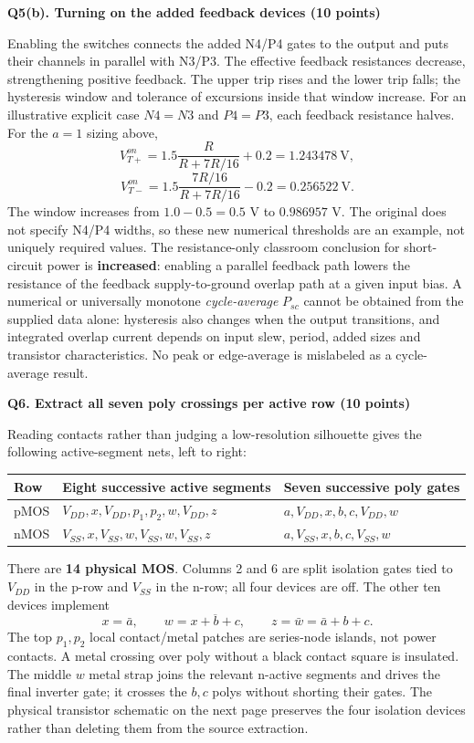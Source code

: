 \documentclass[10pt]{article}
\newcommand{\qheading}[1]{\par\medskip\textbf{#1}\par}
\begin{document}
\newpage
\qheading{Q5(b). Turning on the added feedback devices (10 points)}
Enabling the switches connects the added N4/P4 gates to the output and puts their channels in parallel with N3/P3. The effective feedback resistances decrease, strengthening positive feedback. The upper trip rises and the lower trip falls; the hysteresis window and tolerance of excursions inside that window increase.
For an illustrative explicit case $N4=N3$ and $P4=P3$, each feedback resistance halves. For the $a=1$ sizing above,
\[
V_{T+}^{on}=1.5\frac{R}{R+7R/16}+0.2=1.243478\ \mathrm V,
\]
\[
V_{T-}^{on}=1.5\frac{7R/16}{R+7R/16}-0.2=0.256522\ \mathrm V.
\]
The window increases from $1.0-0.5=0.5$ V to $0.986957$ V. The original does not specify N4/P4 widths, so these new numerical thresholds are an example, not uniquely required values.
The resistance-only classroom conclusion for short-circuit power is \textbf{increased}: enabling a parallel feedback path lowers the resistance of the feedback supply-to-ground overlap path at a given input bias. A numerical or universally monotone \emph{cycle-average} $P_{sc}$ cannot be obtained from the supplied data alone: hysteresis also changes when the output transitions, and integrated overlap current depends on input slew, period, added sizes and transistor characteristics. No peak or edge-average is mislabeled as a cycle-average result.
\qheading{Q6. Extract all seven poly crossings per active row (10 points)}
Reading contacts rather than judging a low-resolution silhouette gives the following active-segment nets, left to right:
\begin{center}\begin{tabular}{lll}\toprule
Row&Eight successive active segments&Seven successive poly gates\\\midrule
pMOS&$V_{DD},x,V_{DD},p_1,p_2,w,V_{DD},z$&$a,V_{DD},x,b,c,V_{DD},w$\\
nMOS&$V_{SS},x,V_{SS},w,V_{SS},w,V_{SS},z$&$a,V_{SS},x,b,c,V_{SS},w$\\\bottomrule
\end{tabular}\end{center}
There are \textbf{14 physical MOS}. Columns 2 and 6 are split isolation gates tied to $V_{DD}$ in the p-row and $V_{SS}$ in the n-row; all four devices are off. The other ten devices implement
\[
x=\bar a,\qquad w=\overline{x+b+c},\qquad z=\bar w=\bar a+b+c.
\]
The top $p_1,p_2$ local contact/metal patches are series-node islands, not power contacts. A metal crossing over poly without a black contact square is insulated. The middle $w$ metal strap joins the relevant n-active segments and drives the final inverter gate; it crosses the $b,c$ polys without shorting their gates. The physical transistor schematic on the next page preserves the four isolation devices rather than deleting them from the source extraction.
\end{document}
